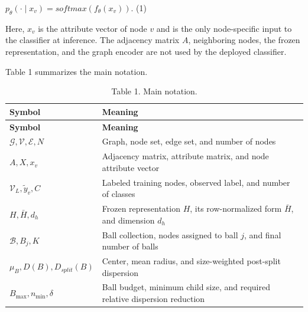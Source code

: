 \(p_{\theta}( \cdot \mid x_{v}) = softmax\left( f_{\theta}(x_{v}) \right).\) (1)

Here, \(x_{v}\) is the attribute vector of node \(v\) and is the only node-specific input to the classifier at inference. The adjacency matrix \(A\), neighboring nodes, the frozen representation, and the graph encoder are not used by the deployed classifier.

Table 1 summarizes the main notation.

\begin{longtable}[]{@{}
  >{\raggedright\arraybackslash}p{}
  >{\raggedright\arraybackslash}p{}@{}}
\caption{Table 1. Main notation.}\tabularnewline
\toprule\noalign{}
\begin{minipage}[b]{\linewidth}\raggedright
\textbf{Symbol}
\end{minipage} & \begin{minipage}[b]{\linewidth}\raggedright
\textbf{Meaning}
\end{minipage} \\
\midrule\noalign{}
\endfirsthead
\toprule\noalign{}
\begin{minipage}[b]{\linewidth}\raggedright
\textbf{Symbol}
\end{minipage} & \begin{minipage}[b]{\linewidth}\raggedright
\textbf{Meaning}
\end{minipage} \\
\midrule\noalign{}
\endhead
\bottomrule\noalign{}
\endlastfoot
\(\mathcal{G},\mathcal{V},\mathcal{E},N\) & Graph, node set, edge set, and number of nodes \\
\(A,X,x_{v}\) & Adjacency matrix, attribute matrix, and node attribute vector \\
\(\mathcal{V}_{L},{\widetilde{y}}_{v},C\) & Labeled training nodes, observed label, and number of classes \\
\(H,\bar{H},d_{h}\) & Frozen representation \(H\), its row-normalized form \(\bar{H}\), and dimension \(d_{h}\) \\
\(\mathcal{B},B_{j},K\) & Ball collection, nodes assigned to ball \(j\), and final number of balls \\
\(\mu_{B},D(B),D_{split}(B)\) & Center, mean radius, and size-weighted post-split dispersion \\
\(B_{\max},n_{\min},\delta\) & Ball budget, minimum child size, and required relative dispersion reduction \\

\end{longtable}
